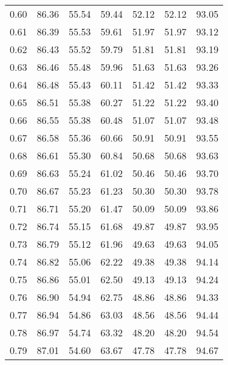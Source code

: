 \begin{tabular}{|c|c|c|c|c|c|c|}
      0.60 &     86.36 &     55.54 &      59.44 &   52.12 &      52.12 &         93.05 \\
      0.61 &     86.39 &     55.53 &      59.61 &   51.97 &      51.97 &         93.12 \\
      0.62 &     86.43 &     55.52 &      59.79 &   51.81 &      51.81 &         93.19 \\
      0.63 &     86.46 &     55.48 &      59.96 &   51.63 &      51.63 &         93.26 \\
      0.64 &     86.48 &     55.43 &      60.11 &   51.42 &      51.42 &         93.33 \\
      0.65 &     86.51 &     55.38 &      60.27 &   51.22 &      51.22 &         93.40 \\
      0.66 &     86.55 &     55.38 &      60.48 &   51.07 &      51.07 &         93.48 \\
      0.67 &     86.58 &     55.36 &      60.66 &   50.91 &      50.91 &         93.55 \\
      0.68 &     86.61 &     55.30 &      60.84 &   50.68 &      50.68 &         93.63 \\
      0.69 &     86.63 &     55.24 &      61.02 &   50.46 &      50.46 &         93.70 \\
      0.70 &     86.67 &     55.23 &      61.23 &   50.30 &      50.30 &         93.78 \\
      0.71 &     86.71 &     55.20 &      61.47 &   50.09 &      50.09 &         93.86 \\
      0.72 &     86.74 &     55.15 &      61.68 &   49.87 &      49.87 &         93.95 \\
      0.73 &     86.79 &     55.12 &      61.96 &   49.63 &      49.63 &         94.05 \\
      0.74 &     86.82 &     55.06 &      62.22 &   49.38 &      49.38 &         94.14 \\
      0.75 &     86.86 &     55.01 &      62.50 &   49.13 &      49.13 &         94.24 \\
      0.76 &     86.90 &     54.94 &      62.75 &   48.86 &      48.86 &         94.33 \\
      0.77 &     86.94 &     54.86 &      63.03 &   48.56 &      48.56 &         94.44 \\
      0.78 &     86.97 &     54.74 &      63.32 &   48.20 &      48.20 &         94.54 \\
      0.79 &     87.01 &     54.60 &      63.67 &   47.78 &      47.78 &         94.67 \\

\end{tabular}
